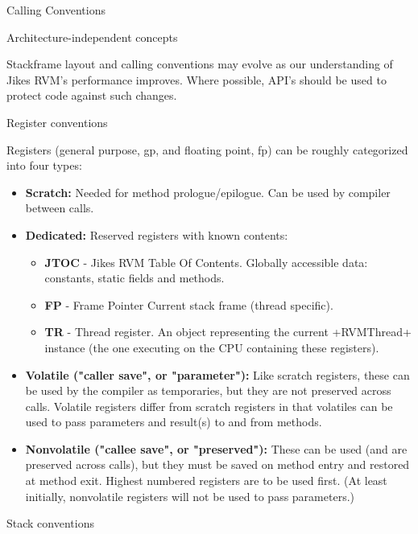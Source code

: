 \begin{section}{Calling Conventions}
\label{sec:callingconventions}

\begin{subsection}{Architecture-independent concepts}

Stackframe layout and calling conventions may evolve as our understanding of Jikes RVM's performance improves. Where possible, API's should be used to protect code against such changes.

\begin{subsubsection}{Register conventions}

Registers (general purpose, gp, and floating point, fp) can be roughly categorized into four types:
\begin{itemize}
  \item \textbf{Scratch:} Needed for method prologue/epilogue. Can be used by compiler between calls.
  \item \textbf{Dedicated:} Reserved registers with known contents:
    \begin{itemize}
      \item \textbf{JTOC} - Jikes RVM Table Of Contents. Globally accessible data: constants, static fields and methods.
      \item \textbf{FP} - Frame Pointer Current stack frame (thread specific).
      \item \textbf{TR} - Thread register. An object representing the current \spverb+RVMThread+ instance (the one executing on the CPU containing these registers).
    \end{itemize}
  \item \textbf{Volatile ("caller save", or "parameter"):} Like scratch registers, these can be used by the compiler as temporaries, but they are not preserved across calls. Volatile registers differ from scratch registers in that volatiles can be used to pass parameters and result(s) to and from methods.
  \item \textbf{Nonvolatile ("callee save", or "preserved"):} These can be used (and are preserved across calls), but they must be saved on method entry and restored at method exit. Highest numbered registers are to be used first. (At least initially, nonvolatile registers will not be used to pass parameters.)
\end{itemize}

\end{subsubsection}

\begin{subsubsection}{Stack conventions}


\end{subsubsection}
\end{subsection}
\end{section}
